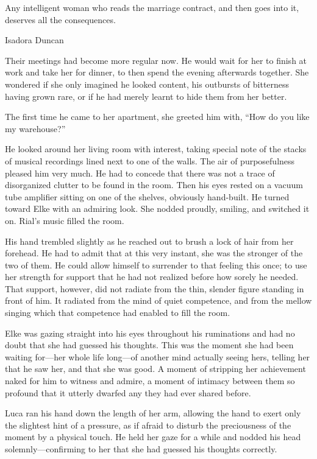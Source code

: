 \epigraph{Any intelligent woman who reads the marriage contract, and then goes into it, deserves all the consequences.}{Isadora Duncan}

\firstparagraph

Their meetings had become more regular now. He would wait for her to finish at work and take her for dinner, to then spend the evening afterwards together. She wondered if she only imagined he looked content, his outbursts of bitterness having grown rare, or if he had merely learnt to hide them from her better.

The first time he came to her apartment, she greeted him with, ``How do you like my warehouse?''

He looked around her living room with interest, taking special note of the stacks of musical recordings lined next to one of the walls. The air of purposefulness pleased him very much. He had to concede that there was not a trace of disorganized clutter to be found in the room. Then his eyes rested on a vacuum tube amplifier sitting on one of the shelves, obviously hand-built. He turned toward Elke with an admiring look. She nodded proudly, smiling, and switched it on. Rial's music filled the room.

His hand trembled slightly as he reached out to brush a lock of hair from her forehead. He had to admit that at this very instant, she was the stronger of the two of them. He could allow himself to surrender to that feeling this once; to use her strength for support that he had not realized before how sorely he needed. That support, however, did not radiate from the thin, slender figure standing in front of him. It radiated from the mind of quiet competence, and from the mellow singing which that competence had enabled to fill the room.

Elke was gazing straight into his eyes throughout his ruminations and had no doubt that she had guessed his thoughts. This was the moment she had been waiting for---her whole life long---of another mind actually seeing hers, telling her that he saw her, and that she was good. A moment of stripping her achievement naked for him to witness and admire, a moment of intimacy between them so profound that it utterly dwarfed any they had ever shared before.

Luca ran his hand down the length of her arm, allowing the hand to exert only the slightest hint of a pressure, as if afraid to disturb the preciousness of the moment by a physical touch. He held her gaze for a while and nodded his head solemnly---confirming to her that she had guessed his thoughts correctly.

